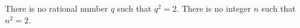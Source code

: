 There is no rational number $q$ such that $q^{2} = 2$.
There is no integer $n$ such that $n^{2} = 2$.